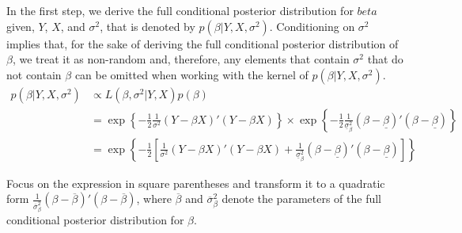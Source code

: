 \documentclass[
  letterpaper,
  DIV=11,
  numbers=noendperiod]{scrreprt}
\begin{document}
In the first step, we derive the full conditional posterior distribution
for \(beta\) given, \(Y\), \(X\), and \(\sigma^2\), that is denoted by
\(p\left(\beta|Y,X,\sigma^2\right)\). Conditioning on \(\sigma^2\)
implies that, for the sake of deriving the full conditional posterior
distribution of \(\beta\), we treat it as non-random and, therefore, any
elements that contain \(\sigma^2\) that do not contain \(\beta\) can be
omitted when working with the kernel of
\(p\left(\beta|Y,X,\sigma^2\right)\). \begin{align} 
p\left(\beta|Y,X,\sigma^2\right) &\propto L\left(\beta,\sigma^2|Y,X\right)p\left(\beta\right)\\
&= \exp\left\{ -\frac{1}{2}\frac{1}{\sigma^2}(Y-\beta X)'(Y-\beta X) \right\} \times
\exp\left\{ -\frac{1}{2}\frac{1}{\underline{\sigma}_{\beta}^2}(\beta-\underline{\beta})'(\beta-\underline{\beta}) \right\}\\
&= \exp\left\{ -\frac{1}{2}\left[\frac{1}{\sigma^2}(Y-\beta X)'(Y-\beta X) + \frac{1}{\underline{\sigma}_{\beta}^2}(\beta-\underline{\beta})'(\beta-\underline{\beta}) \right]\right\}\label{eq:betafullcond}
\end{align}

Focus on the expression in square parentheses and transform it to a
quadratic form
\(\frac{1}{\overline{\sigma}_{\beta}^2}(\beta-\overline{\beta})'(\beta-\overline{\beta})\),
where \(\overline{\beta}\) and \(\overline{\sigma}_{\beta}^2\) denote
the parameters of the full conditional posterior distribution for
\(\beta\).
\end{document}
